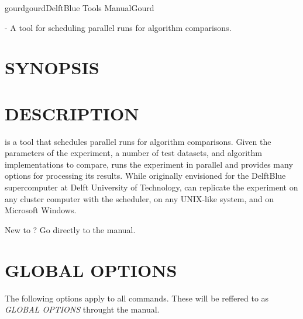 \documentclass[a4paper,english]{article}
\begin{document}
    \pagestyle{fancy}


    \begin{Name}{1}{gourd}{gourd}{DelftBlue Tools Manual}{Gourd}
\begin{adjustwidth}{18pt}{0pt}

         - A tool for scheduling parallel runs for algorithm comparisons.

\end{adjustwidth}
    \end{Name}


\begin{adjustwidth}{18pt}{0pt}
    \section{SYNOPSIS}

         

    \section{DESCRIPTION}

         is a tool that schedules parallel runs for algorithm comparisons.
        Given the parameters of the experiment, a number of test datasets, and algorithm implementations to compare,
         runs the experiment in parallel and provides many options for processing its results.
        While originally envisioned for the DelftBlue supercomputer at Delft University of Technology,
         can replicate the experiment on any cluster computer with the  scheduler,
        on any UNIX-like system, and on Microsoft Windows.

        New to ? Go directly to the  manual.


    \section{GLOBAL OPTIONS}

        The following options apply to all  commands.
        These will be reffered to as \emph{GLOBAL OPTIONS} throught the manual.


\end{adjustwidth}
\end{document}
